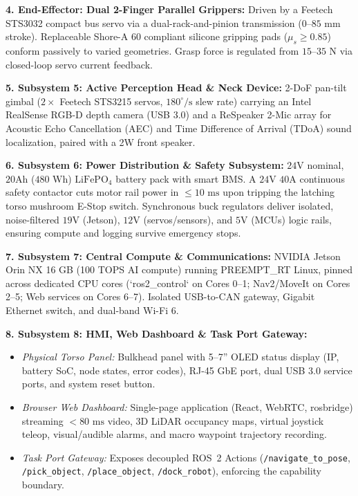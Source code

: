 \documentclass[10pt,a4paper]{article}
\begin{document}
\textbf{4. End-Effector: Dual 2-Finger Parallel Grippers:} Driven by a Feetech STS3032 compact bus servo via a dual-rack-and-pinion transmission ($0\text{--}85\text{ mm}$ stroke). Replaceable Shore-A 60 compliant silicone gripping pads ($\mu_s \ge 0.85$) conform passively to varied geometries. Grasp force is regulated from $15\text{--}35\text{ N}$ via closed-loop servo current feedback.

\textbf{5. Subsystem 5: Active Perception Head \& Neck Device:} 2-DoF pan-tilt gimbal ($2\times$ Feetech STS3215 servos, $180^\circ/\text{s}$ slew rate) carrying an Intel RealSense RGB-D depth camera (USB 3.0) and a ReSpeaker 2-Mic array for Acoustic Echo Cancellation (AEC) and Time Difference of Arrival (TDoA) sound localization, paired with a 2W front speaker.

\textbf{6. Subsystem 6: Power Distribution \& Safety Subsystem:} $24\text{V}$ nominal, $20\text{Ah}$ ($480\text{ Wh}$) $\text{LiFePO}_4$ battery pack with smart BMS. A $24\text{V } 40\text{A}$ continuous safety contactor cuts motor rail power in $\le 10\text{ ms}$ upon tripping the latching torso mushroom E-Stop switch. Synchronous buck regulators deliver isolated, noise-filtered $19\text{V}$ (Jetson), $12\text{V}$ (servos/sensors), and $5\text{V}$ (MCUs) logic rails, ensuring compute and logging survive emergency stops.

\textbf{7. Subsystem 7: Central Compute \& Communications:} NVIDIA Jetson Orin NX 16 GB (100 TOPS AI compute) running PREEMPT\_RT Linux, pinned across dedicated CPU cores (`ros2\_control` on Cores 0--1; Nav2/MoveIt on Cores 2--5; Web services on Cores 6--7). Isolated USB-to-CAN gateway, Gigabit Ethernet switch, and dual-band Wi-Fi 6.

\textbf{8. Subsystem 8: HMI, Web Dashboard \& Task Port Gateway:}
\begin{itemize}[leftmargin=1.2em,noitemsep,topsep=1pt]
  \item \emph{Physical Torso Panel:} Bulkhead panel with 5--7'' OLED status display (IP, battery SoC, node states, error codes), RJ-45 GbE port, dual USB 3.0 service ports, and system reset button.
  \item \emph{Browser Web Dashboard:} Single-page application (React, WebRTC, rosbridge) streaming $<80\text{ ms}$ video, 3D LiDAR occupancy maps, virtual joystick teleop, visual/audible alarms, and macro waypoint trajectory recording.
  \item \emph{Task Port Gateway:} Exposes decoupled ROS~2 Actions (\texttt{/navigate\_to\_pose}, \texttt{/pick\_object}, \texttt{/place\_object}, \texttt{/dock\_robot}), enforcing the capability boundary.
\end{itemize}
\end{document}
